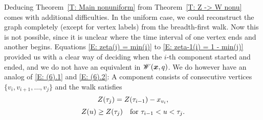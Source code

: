 Deducing Theorem~\ref{T: Main nonuniform} from Theorem~\ref{T: Z -> W nonu} comes with additional difficulties.
In the uniform case, we could reconstruct the graph completely (except for vertex labels) from the breadth-first walk.
Now this is not possible, since it is unclear where the time interval of one vertex ends and another begins.
Equations \eqref{E: zeta(j) = min(i)} to \eqref{E: zeta-1(i) = 1 - min(j)} 
provided us with a clear way of deciding when the $i$-th component started and ended,
and we do not have an equivalent in $\mathscr{W}(\boldsymbol{x}, q)$.
We do however have an analog of \eqref{E: (6).1} and \eqref{E: (6).2}:
A component consists of consecutive vertices $\{v_i, v_{i+1}, \dots, v_j\}$ and the walk satisfies
\begin{equation} \label{E: (6).1 nonu}
	Z(\tau_j) = Z(\tau_{i-1}) - x_{v_i},
\end{equation}
\begin{equation} \label{E: (6).2 nonu}
	Z(u) \geq Z(\tau_j) \quad \text{for $\tau_{i-1} < u < \tau_j$}.
\end{equation}
